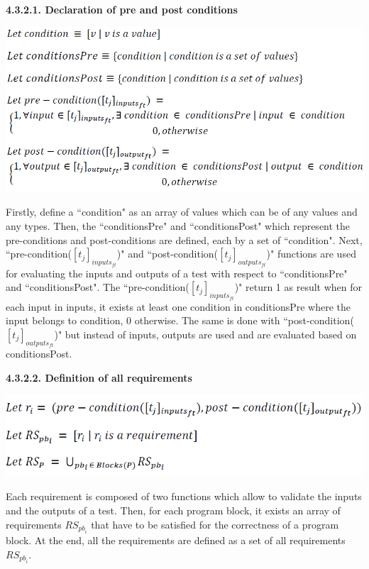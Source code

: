 \documentclass[conference,compsoc]{IEEEtran}
\begin{document}
\noindent
\newline\newline
\textbf{4.3.2.1. Declaration of pre and post conditions}
\begin{center}
\includegraphics[scale=0.4]{Proof2-Part1.png} 
\end{center}

Firstly, define a ``condition" as an array of values which can be of any values and any types. Then, the ``conditionsPre" and ``conditionsPost" which represent the pre-conditions and post-conditions are defined, each by a set of ``condition".  
\newline
Next, ``pre-condition($[t_{j}]_{inputs_{ft}}$)" and ``post-condition($[t_{j}]_{outputs_{ft}}$)" functions are used for evaluating the inputs and outputs of a test with respect to ``conditionsPre" and ``conditionsPost". The ``pre-condition($[t_{j}]_{inputs_{ft}}$)" return 1 as result when for each input in inputs, it exists at least one condition in conditionsPre where the input belongs to condition, 0 otherwise. 
\newline
The same is done with ``post-condition($[t_{j}]_{outputs_{ft}}$)" but instead of inputs, outputs are used and are evaluated based on conditionsPost.  

\noindent
\newline
\textbf{4.3.2.2. Definition of all requirements}
\begin{center}
\includegraphics[scale=0.5]{Proof2-Part2.png} 
\end{center}

Each requirement is composed of two functions which allow to validate the inputs and the outputs of a test. Then, for each program block, it exists an array of requirements ${RS}_{{pb}_{i}}$ that have to be satisfied for the correctness of a program block. At the end, all the requirements are defined as a set of all requirements ${RS}_{{pb}_{i}}$. 
\end{document}
